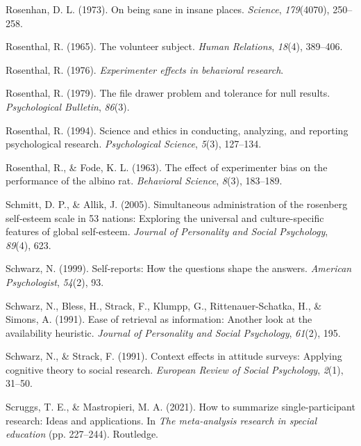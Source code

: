 \documentclass[
]{krantz}
\newlength{\cslhangindent}
\newenvironment{CSLReferences}[2] %
 {\begin{list}{}{%
  \setlength{\itemindent}{0pt}
  \setlength{\leftmargin}{0pt}
  \setlength{\parsep}{0pt}
  \ifodd #1
   \setlength{\leftmargin}{\cslhangindent}
   \setlength{\itemindent}{-1\cslhangindent}
  \fi
  \setlength{\itemsep}{#2\baselineskip}}}
 {\end{list}}
\begin{document}
\begin{CSLReferences}{1}{0}
Rosenhan, D. L. (1973). On being sane in insane places. \emph{Science}, \emph{179}(4070), 250--258.

Rosenthal, R. (1965). The volunteer subject. \emph{Human Relations}, \emph{18}(4), 389--406.

Rosenthal, R. (1976). \emph{Experimenter effects in behavioral research}.

Rosenthal, R. (1979). The file drawer problem and tolerance for null results. \emph{Psychological Bulletin}, \emph{86}(3).

Rosenthal, R. (1994). Science and ethics in conducting, analyzing, and reporting psychological research. \emph{Psychological Science}, \emph{5}(3), 127--134.

Rosenthal, R., \& Fode, K. L. (1963). The effect of experimenter bias on the performance of the albino rat. \emph{Behavioral Science}, \emph{8}(3), 183--189.

Schmitt, D. P., \& Allik, J. (2005). Simultaneous administration of the rosenberg self-esteem scale in 53 nations: Exploring the universal and culture-specific features of global self-esteem. \emph{Journal of Personality and Social Psychology}, \emph{89}(4), 623.

Schwarz, N. (1999). Self-reports: How the questions shape the answers. \emph{American Psychologist}, \emph{54}(2), 93.

Schwarz, N., Bless, H., Strack, F., Klumpp, G., Rittenauer-Schatka, H., \& Simons, A. (1991). Ease of retrieval as information: Another look at the availability heuristic. \emph{Journal of Personality and Social Psychology}, \emph{61}(2), 195.

Schwarz, N., \& Strack, F. (1991). Context effects in attitude surveys: Applying cognitive theory to social research. \emph{European Review of Social Psychology}, \emph{2}(1), 31--50.

Scruggs, T. E., \& Mastropieri, M. A. (2021). How to summarize single-participant research: Ideas and applications. In \emph{The meta-analysis research in special education} (pp. 227--244). Routledge.


\end{CSLReferences}
\end{document}
